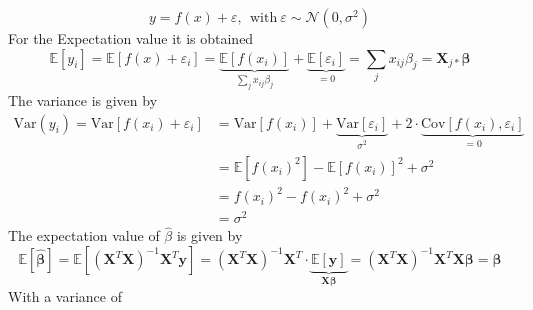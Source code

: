 \begin{equation}
    y = f(x) + \varepsilon, ~~\text{with} ~\varepsilon \sim \mathcal{N}(0, \sigma^2)
\end{equation}
For the Expectation value it is obtained
\begin{equation}
\mathbb{E}[y_i] = \mathbb{E}[f(x) + \varepsilon_i] = 
\underbrace{\mathbb{E}[f(x_i)]}_{\sum_j x_{ij} \beta_j} + 
\underbrace{\mathbb{E}[\varepsilon_i]}_{=0} = 
\sum _j x_{ij}\beta_j = \textbf{X}_{j*} \boldsymbol\beta
\end{equation}
The variance is given by
\begin{equation}
\begin{split}
    \text{Var}(y_i) = \text{Var}[f(x_i) + \varepsilon_i] & = \text{Var}[f(x_i)] +\underbrace{\text{Var}[\varepsilon_i]}_{\sigma^2} + 2\cdot \underbrace{\text{Cov}[f(x_i), \varepsilon_i]}_{=0} \\
   & = \mathbb{E}[f(x_i)^2] - \mathbb{E}[f(x_i)]^2 + \sigma^2 \\
   & = f(x_i)^2 - f(x_i)^2 + \sigma^2 \\
   & = \sigma ^2
    \end{split}
\end{equation}
The expectation value of $\hat\beta$ is given by
\begin{equation}
    \mathbb{E}[\boldsymbol{\hat\beta}] = \mathbb{E}[(\boldsymbol{X}^T\boldsymbol{X})^{-1}\boldsymbol{X}^T\boldsymbol{y}] = (\boldsymbol{X}^T\boldsymbol{X})^{-1} \boldsymbol{X}^T\cdot \underbrace{\mathbb{E}[\boldsymbol{y}]}_{\boldsymbol{X}\boldsymbol\beta} = (\boldsymbol{X}^T\boldsymbol{X})^{-1}\boldsymbol{X}^T\boldsymbol{X}\boldsymbol\beta = \boldsymbol\beta 
\end{equation}
With a variance of 
